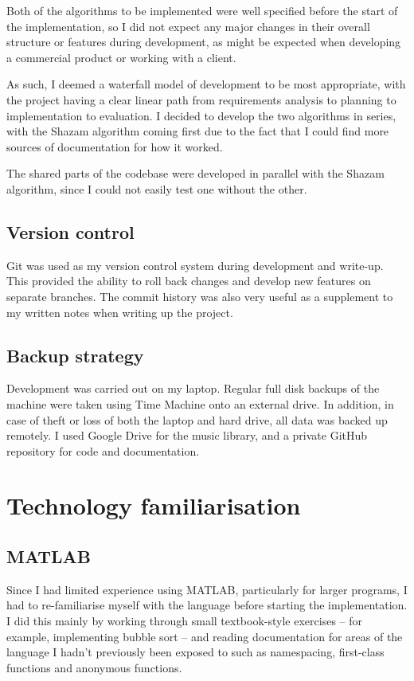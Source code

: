 \documentclass[12pt,a4paper,twoside,openright]{report}
\begin{document}
Both of the algorithms to be implemented were well specified before the start of the implementation, so I did not expect any major changes in their overall structure or features during development, as might be expected when developing a commercial product or working with a client. 

As such, I deemed a waterfall model of development to be most appropriate, with the project having a clear linear path from requirements analysis to planning to implementation to evaluation. I decided to develop the two algorithms in series, with the Shazam algorithm coming first due to the fact that I could find more sources of documentation for how it worked.

The shared parts of the codebase were developed in parallel with the Shazam algorithm, since I could not easily test one without the other.


\subsection{Version control}

Git was used as my version control system during development and write-up. This provided the ability to roll back changes and develop new features on separate branches. The commit history was also very useful as a supplement to my written notes when writing up the project.


\subsection{Backup strategy}

Development was carried out on my laptop. Regular full disk backups of the machine were taken using Time Machine onto an external drive. In addition, in case of theft or loss of both the laptop and hard drive, all data was backed up remotely. I used Google Drive for the music library, and a private GitHub repository for code and documentation.




\section{Technology familiarisation}

\subsection{MATLAB}

Since I had limited experience using MATLAB, particularly for larger programs, I had to re-familiarise myself with the language before starting the implementation. I did this mainly by working through small textbook-style exercises -- for example, implementing bubble sort -- and reading documentation for areas of the language I hadn't previously been exposed to such as namespacing, first-class functions and anonymous functions.
\end{document}
